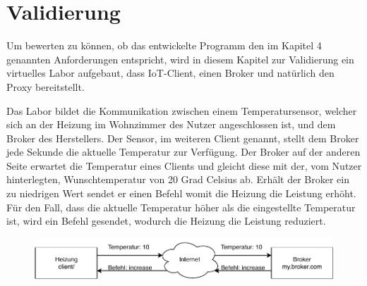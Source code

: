 \chapter{Validierung}
    
Um bewerten zu können, ob das entwickelte Programm den im Kapitel 4 genannten Anforderungen entspricht, wird in diesem Kapitel zur Validierung ein virtuelles Labor aufgebaut, dass \ac{IoT}-Client, einen Broker und natürlich den Proxy bereitstellt.

Das Labor bildet die Kommunikation zwischen einem Temperatursensor, welcher sich an der Heizung im Wohnzimmer des Nutzer angeschlossen ist, und dem Broker des Herstellers. Der Sensor, im weiteren Client genannt, stellt dem Broker jede Sekunde die aktuelle Temperatur zur Verfügung. Der Broker auf der anderen Seite erwartet die Temperatur eines Clients und gleicht diese mit der, vom Nutzer hinterlegten, Wunschtemperatur von 20 Grad Celsius ab. Erhält der Broker ein zu niedrigen Wert sendet er einen Befehl womit die Heizung die Leistung erhöht. Für den Fall, dass die aktuelle Temperatur höher als die eingestellte Temperatur ist, wird ein Befehl gesendet, wodurch die Heizung die Leistung reduziert.

\begin{figure}[h]%
    \centering
    \includegraphics[width=14cm]{tex/bilder/6_validierung/Szenario1.pdf}
    \label{fig:darstellung-szenario}
\end{figure}

